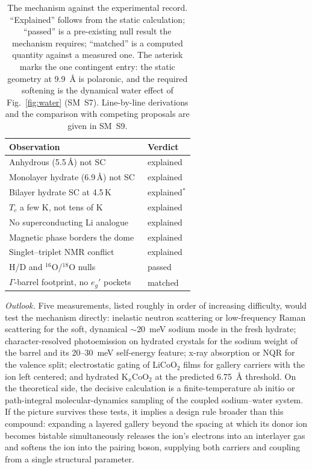 \documentclass[aps,prl,twocolumn,superscriptaddress,floatfix]{revtex4-2}
\begin{document}
\begin{table}[t]
  \caption{The mechanism against the experimental record. ``Explained'' follows from the static
  calculation; ``passed'' is a pre-existing null result the mechanism requires; ``matched'' is a
  computed quantity against a measured one. The asterisk marks the one contingent entry: the
  static geometry at 9.9~\AA{} is polaronic, and the required softening is the dynamical water
  effect of Fig.~\ref{fig:water} (SM~S7). Line-by-line derivations and the comparison with
  competing proposals
  are given in SM~S9.}
  \label{tab:score}
  \renewcommand{\arraystretch}{1.12}%
  \begin{tabular}{@{}p{6.0cm}@{}l@{}}
    \toprule
    \textbf{Observation} & \textbf{Verdict}\\
    \midrule
    Anhydrous (5.5\,\AA) not SC~\cite{Foo2003} & explained\\
    Monolayer hydrate (6.9\,\AA) not SC~\cite{Foo2003} & explained\\
    Bilayer hydrate SC at 4.5\,K~\cite{Takada2003} & explained$^{\ast}$\\
    $T_c$ a few K, not tens of K~\cite{Takada2003} & explained\\
    No superconducting Li analogue & explained\\
    Magnetic phase borders the dome~\cite{Sakurai2015} & explained\\
    Singlet--triplet NMR conflict~\cite{Sakurai2015} & explained\\
    H/D and $^{16}$O/$^{18}$O nulls~\cite{Jin2003,Yokoi2008} & passed\\
    $\Gamma$-barrel footprint, no $e_g'$ pockets~\cite{Geck2007} & matched\\
    \bottomrule
  \end{tabular}
\end{table}

\textit{Outlook.} Five measurements, listed roughly in order of increasing difficulty, would test
the mechanism directly: inelastic neutron scattering or low-frequency Raman scattering for the
soft, dynamical $\sim$20~meV sodium mode in the fresh hydrate; character-resolved photoemission on hydrated crystals for the sodium
weight of the barrel and its 20--30~meV self-energy feature; x-ray absorption or NQR for the
valence split; electrostatic gating of LiCoO$_2$ films for gallery carriers with the ion left
centered; and hydrated K$_x$CoO$_2$ at the predicted 6.75~\AA{} threshold. On the theoretical side,
the decisive calculation is a finite-temperature ab initio or path-integral molecular-dynamics
sampling of the coupled sodium--water system. If the picture survives these tests, it implies a
design rule broader than this compound: expanding a layered
gallery beyond the spacing at which its donor ion becomes bistable simultaneously releases the
ion's electrons into an interlayer gas and softens the ion into the pairing boson, supplying both
carriers and coupling from a single structural parameter.

\begin{acknowledgments}
\end{acknowledgments}



\end{document}
